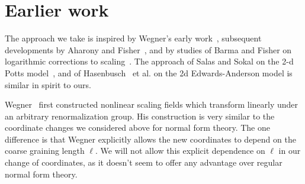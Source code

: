 \documentclass[
 reprint,
 amsmath,amssymb,
 aps, superscriptaddress, pre
]{revtex4-1}
\begin{document}
\section{Earlier work} \label{sec:earlierwork}

The approach we take is inspired by Wegner's early work~\cite{Wegner72,
Wegner73}, subsequent developments by Aharony and
Fisher~\cite{aharony1980university, aharony1983nonlinear}, and by studies of Barma and Fisher on
logarithmic corrections to scaling~\cite{barma1984corrections,
barma1985two}. The approach of Salas and Sokal on the 2-d Potts model~\cite{Salas97}, and  of Hasenbusch~\cite{hasenbusch2008universal} et al. on the 2d Edwards-Anderson model 
is similar in spirit to ours.

Wegner~\cite{Wegner72} first constructed nonlinear scaling fields which transform linearly under an arbitrary renormalization group. His construction is very similar to the coordinate changes we considered above for normal form theory. The one difference is that Wegner explicitly allows the new coordinates to depend on the coarse graining length $\ell$. We will not allow this explicit dependence on $\ell$ in our change of coordinates, as it doesn't seem to offer any advantage over regular normal form theory.



\end{document}
